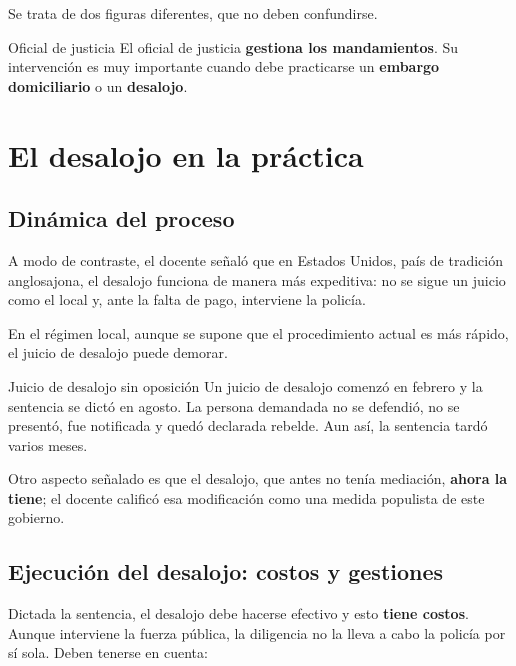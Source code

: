 \documentclass[12pt,oneside]{book}
\begin{document}
Se trata de dos figuras diferentes, que no deben confundirse.

\begin{definition}{Oficial de justicia}
El oficial de justicia \textbf{gestiona los mandamientos}. Su intervención es muy importante cuando debe practicarse un \textbf{embargo domiciliario} o un \textbf{desalojo}.
\end{definition}

\section{El desalojo en la práctica}

\subsection{Dinámica del proceso}

A modo de contraste, el docente señaló que en Estados Unidos, país de tradición anglosajona, el desalojo funciona de manera más expeditiva: no se sigue un juicio como el local y, ante la falta de pago, interviene la policía.

En el régimen local, aunque se supone que el procedimiento actual es más rápido, el juicio de desalojo puede demorar.

\begin{example}{Juicio de desalojo sin oposición}
Un juicio de desalojo comenzó en febrero y la sentencia se dictó en agosto. La persona demandada no se defendió, no se presentó, fue notificada y quedó declarada rebelde. Aun así, la sentencia tardó varios meses.
\end{example}

Otro aspecto señalado es que el desalojo, que antes no tenía mediación, \textbf{ahora la tiene}; el docente calificó esa modificación como una medida populista de este gobierno.

\subsection{Ejecución del desalojo: costos y gestiones}

Dictada la sentencia, el desalojo debe hacerse efectivo y esto \textbf{tiene costos}. Aunque interviene la fuerza pública, la diligencia no la lleva a cabo la policía por sí sola. Deben tenerse en cuenta:
\end{document}

